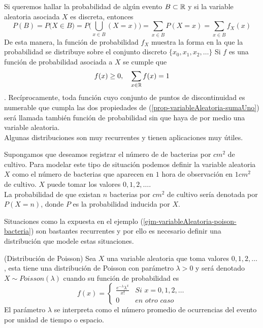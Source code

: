 Si queremos hallar la probabilidad de algún evento $B\subset{\mathbb{R}}$ y si la variable aleatoria asociada $X$ es discreta, entonces
$$P(B)=P\big(X\in B)=P\big(\bigcup_{x\in B}(X=x)\big)=\sum_{x\in B}P(X=x)=\sum_{x\in B}f_X(x)$$
De esta manera, la función de probabilidad $f_X$ muestra la forma en la que la probabilidad se distribuye sobre el conjunto discreto $\{x_0,x_1,x_2,\ldots\}$ 
Si $f$ es una función de probabilidad asociada a $X$ se cumple que 
\begin{eqnarray}
    f(x)\geq 0,\quad\sum_{x\in {\mathbb{R}}}f(x)=1 \label{prop-variableAleatoria-sumaUno}
\end{eqnarray}.
Recíprocamente, toda función cuyo conjunto de puntos de discontinuidad es numerable que cumpla las dos propiedades de (\ref{prop-variableAleatoria-sumaUno}) será llamada también función de probabilidad sin que haya de por medio una variable aleatoria.\\
Algunas distribuciones son muy recurrentes y tienen aplicaciones muy útiles.
\begin{Ejm}
\label{ejm-variableAleatoria-poison-bacteria}
    Supongamos que deseamos  registrar el número de de bacterias por $cm^2$ de cultivo. Para modelar este tipo de situación podemos definir la variable aleatoria $X$ como el número de bacterias que aparecen en $1$ hora de observación en $1 cm^2$ de cultivo. $X$ puede tomar los valores $0,1,2,\ldots$.\\La probabilidad de que existan $n$ bacterias por $cm^2$ de cultivo sería denotada por $P(X=n)$, donde $P$ es la probabilidad inducida por $X$.
\end{Ejm}
Situaciones como la expuesta en el ejemplo  (\ref{ejm-variableAleatoria-poison-bacteria}) son bastantes recurrentes y por ello es necesario definir una distribución que modele estas situaciones.
\begin{Def}(Distribución de Poisson)
    Sea $X$ una variable aleatoria que toma valores $0,1,2,\ldots$ , esta tiene una distribución de Poisson con parámetro $\lambda>0$ y será denotado $X\sim Poisson(\lambda)$ cuando su función de probabilidad es
    $$f(x)=\begin{cases}\frac{e^{-\lambda}\lambda^x}{x!}& \textit{Si }x=0,1,2,\ldots\\
    0 &\textit{en otro caso}
    \end{cases}$$
    El parámetro $\lambda$ se interpreta como el número promedio de ocurrencias del evento por unidad de tiempo o espacio.
\end{Def}

